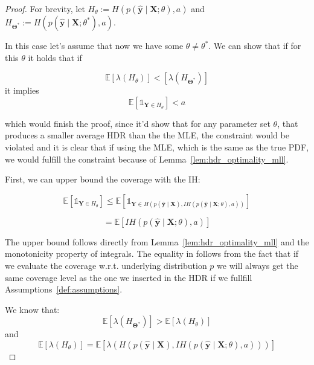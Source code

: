 \begin{proof}
    For brevity, let $H_{\theta} := H(p(\mathbf{\hat{y}}\mid \mathbf{X}; \theta), a)$ and $H_{\mathbf{\Theta^*}} := H(p(\mathbf{\hat{y}}\mid \mathbf{X}; \theta^*), a)$.

    In this case let's assume that now we have some $\theta \neq \theta^*$. We can show that if for this $\theta$ it holds that if

    \begin{equation}
        \mathbb{E} \left[ \lambda(H_{\theta})\right]
        <
        \left[\lambda(H_{\mathbf{\Theta^*}}) \right]
    \end{equation}
    it implies
    \begin{equation}
        \mathbb{E} \left[ \mathds{1}_{\mathbf{Y} \in
        H_{\theta}} \right] < a
    \end{equation}

    which would finish the proof, since it'd show that for any parameter set $\theta$, that produces a smaller average HDR than the the MLE, the constraint would be violated and it is clear that if using the MLE, which is the same as the true PDF, we would fulfill the constraint because of Lemma~\ref{lem:hdr_optimality_mll}.

    First, we can upper bound the coverage with the IH:

    \begin{equation}
        \mathbb{E} \left[ \mathds{1}_{\mathbf{Y} \in
        H_{\theta}} \right]
        \leq
        \mathbb{E} \left[ \mathds{1}_{\mathbf{Y} \in
        H(p(\mathbf{\hat{y}} \mid \mathbf{X}), IH(p(\mathbf{\hat{y}}\mid
        \mathbf{X};
        \theta), a))} \right]
        \label{eq:upper_bound}
    \end{equation}

    \begin{equation}
        = \mathbb{E}\left[IH(p(\mathbf{\hat{y}}\mid \mathbf{X}; \theta),
            a)
            \right]
        \label{eq:upper_bound_2}
    \end{equation}

    The upper bound follows directly from Lemma~\ref{lem:hdr_optimality_mll} and the monotonicity property of integrals. The equality in  follows from the fact that if we evaluate the coverage w.r.t. underlying distribution $p$ we will always get the same coverage level as the one we inserted in the HDR if we fullfill Assumptions~\ref{def:assumptions}.

    We know that:
    \begin{equation}
        \mathbb{E}\left[\lambda(H_{\mathbf{\Theta^*}})\right] > \mathbb{E}\left[ \lambda(H_{\theta}) \right]
        \label{eq:inequality_0}
    \end{equation}
    and
    \begin{equation}
        \mathbb{E}\left[ \lambda(H_{\theta}) \right]
        =\mathbb{E}\left[ \lambda(H(p(\mathbf{\hat{y}}\mid\mathbf{X}),
            IH(p(\mathbf{\hat{y}}\mid \mathbf{X}; \theta), a)))
            \right]
        \label{eq:inequality_1}
    \end{equation}


\end{proof}
